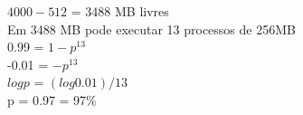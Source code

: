 $4000 - 512$ = 3488 MB livres \\
Em 3488 MB pode executar 13 processos de 256MB\\
0.99 = $1 - p^13$\\
-0.01 = $-p^13$\\
$log p$ = $(log 0.01)/13$\\
p = 0.97 = 97\%